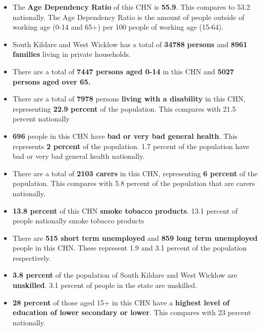 \documentclass{article}
\begin{document}
\begin{itemize}

\item The \textbf{Age Dependency Ratio} of this CHN is  \textbf{55.9}. This compares to 53.2 nationally. The Age Dependency Ratio is the amount of people outside of working age (0-14 and 65+) per 100 people of working age (15-64). 

\item South Kildare and West Wicklow has a total of \textbf{\num{34788}} \textbf{persons} and  \textbf{\num{8961}} \textbf{families} living in private households.

\item There are a total of \textbf{\num{7447} persons aged 0-14} in this CHN and \textbf{\num{5027} persons aged over 65.} 

\item There are a total of \textbf{\num{7978}} persons \textbf{living with a disability} in this CHN, representing \textbf{22.9 percent} of the population. This compares with  21.5 percent nationally

\item \textbf{\num{696}} people in this CHN have \textbf{bad or very bad general health}. This represents \textbf{2 percent} of the population. 1.7 percent of the population have bad or very bad general health nationally. 

\item There are a total of \textbf{\num{2103} carers} in this CHN, representing \textbf{6 percent} of the population. This compares with 5.8 percent of the population that are carers nationally. 

\item \textbf{13.8 percent} of this CHN \textbf{smoke tobacco products}. 13.1 percent of people nationally smoke tobacco products

\item There are \textbf{\num{515} short term unemployed} and \textbf{\num{859} long term unemployed} people in this CHN. These represent 1.9 and 3.1 percent of the population respectively.

\item  \textbf{3.8 percent} of the population of South Kildare and West Wicklow are \textbf{unskilled}. 3.1 percent of people in the state are unskilled.

\item \textbf{28 percent} of those aged 15+ in this CHN have a \textbf{highest level of education of lower secondary or lower}. This compares with 23 percent nationally. 


\end{itemize}
\end{document}
